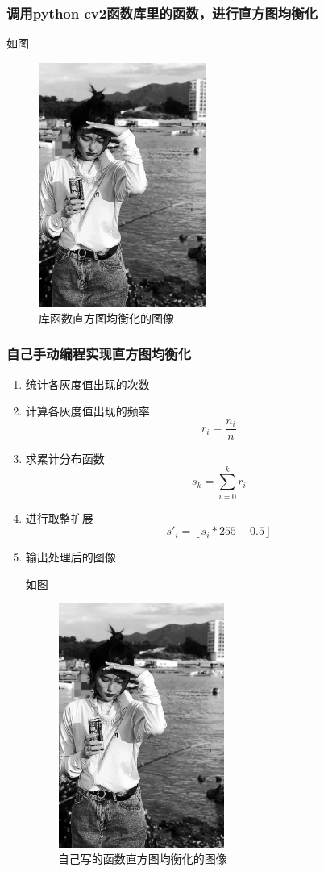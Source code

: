 \documentclass{article}
\begin{document}
  \subsubsection{调用python \quad cv2函数库里的函数，进行直方图均衡化}

  如图
  \begin{figure}[h!]
                \centering
                \includegraphics[width=5.5cm,height=8cm]{xuan2.png}
                \caption{库函数直方图均衡化的图像}
                \end{figure}
  \subsubsection{自己手动编程实现直方图均衡化}
  \begin{enumerate}
    \item 统计各灰度值出现的次数
    \item 计算各灰度值出现的频率$$r_i=\frac{n_i}{n}$$
    \item 求累计分布函数 $$s_k=\sum_{i=0}^{k} r_i$$
    \item 进行取整扩展 $$s'_i=\left \lfloor s_i*255+0.5 \right \rfloor$$
    \item 输出处理后的图像

    如图
     \begin{figure}[h!]
                \centering
                \includegraphics[width=5.5cm,height=8cm]{xuan3.png}
                \caption{自己写的函数直方图均衡化的图像}
                \end{figure}
  \end{enumerate}
 \newpage
\end{document}
